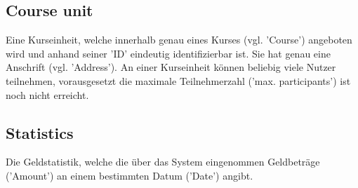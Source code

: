 \subsection{Course unit}
Eine Kurseinheit, welche innerhalb genau eines Kurses (vgl. 'Course') angeboten wird und anhand seiner 'ID' eindeutig identifizierbar ist. Sie hat genau eine Anschrift (vgl. 'Address'). An einer Kurseinheit können beliebig viele Nutzer teilnehmen, vorausgesetzt die maximale Teilnehmerzahl ('max. participants') ist noch nicht erreicht. 

\subsection{Statistics}
Die Geldstatistik, welche die über das System eingenommen Geldbeträge ('Amount') an einem bestimmten Datum ('Date') angibt.
